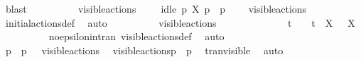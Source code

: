 \begin{isabellebody}
\ blast\isanewline
\ \ \ \ \ \ \isamarkupfalse%
\ {\isacartoucheopen}{\isasymalpha}\ {\isasymin}\ visible{\isacharunderscore}{\kern0pt}actions\ {\isasymor}\ {\isasymalpha}\ {\isacharequal}{\kern0pt}\ {\isasymtau}{\isacartoucheclose}\ {\isacartoucheopen}idle\ p\ X{\isacartoucheclose}\ {\isacartoucheopen}p\ {\isasymlongmapsto}{\isasymalpha}\ p{\isacharprime}{\kern0pt}{\isacartoucheclose}\ \isamarkupfalse%
\ {\isacartoucheopen}{\isasymalpha}\ {\isasymin}\ visible{\isacharunderscore}{\kern0pt}actions{\isacartoucheclose}\ \isanewline
\ \ \ \ \ \ \ \ \isamarkupfalse%
\ initial{\isacharunderscore}{\kern0pt}actions{\isacharunderscore}{\kern0pt}def\ \isamarkupfalse%
\ auto\isanewline
\ \ \ \ \ \ \isamarkupfalse%
\ {\isacartoucheopen}{\isasymalpha}\ {\isasymin}\ visible{\isacharunderscore}{\kern0pt}actions{\isacartoucheclose}\isanewline
\ \ \ \ \ \ \isamarkupfalse%
\ {\isacartoucheopen}{\isasymalpha}\ {\isasymnoteq}\ {\isasymtau}\ {\isasymand}\ {\isasymalpha}\ {\isasymnoteq}\ t\ {\isasymand}\ {\isasymalpha}\ {\isasymnoteq}\ t{\isacharunderscore}{\kern0pt}{\isasymepsilon}\ {\isasymand}\ {\isacharparenleft}{\kern0pt}{\isasymforall}X{\isachardot}{\kern0pt}\ {\isasymalpha}\ {\isasymnoteq}\ {\isasymepsilon}{\isacharbrackleft}{\kern0pt}X{\isacharbrackright}{\kern0pt}{\isacharparenright}{\kern0pt}{\isacartoucheclose}\isanewline
\ \ \ \ \ \ \ \ \isamarkupfalse%
\ no{\isacharunderscore}{\kern0pt}epsilon{\isacharunderscore}{\kern0pt}in{\isacharunderscore}{\kern0pt}tran\ visible{\isacharunderscore}{\kern0pt}actions{\isacharunderscore}{\kern0pt}def\ \isamarkupfalse%
\ auto\isanewline
\isanewline
\ \ \ \ \ \ \isamarkupfalse%
\ {\isacartoucheopen}p\ {\isasymlongmapsto}{\isasymalpha}\ p{\isacharprime}{\kern0pt}{\isacartoucheclose}\ {\isacartoucheopen}{\isasymalpha}\ {\isasymin}\ visible{\isacharunderscore}{\kern0pt}actions{\isacartoucheclose}\ \isamarkupfalse%
\ {\isacartoucheopen}{\isasymtheta}{\isacharbrackleft}{\kern0pt}visible{\isacharunderscore}{\kern0pt}actions{\isacharbrackright}{\kern0pt}{\isacharparenleft}{\kern0pt}p{\isacharparenright}{\kern0pt}\ {\isasymlongmapsto}\isactrlsup {\isasymtheta}{\isasymalpha}\ {\isasymtheta}{\isacharparenleft}{\kern0pt}p{\isacharprime}{\kern0pt}{\isacharparenright}{\kern0pt}{\isacartoucheclose}\ \isamarkupfalse%
\ tran{\isacharunderscore}{\kern0pt}visible\ \isamarkupfalse%
\ auto\isanewline
\ \ \ \ \ \ \isamarkupfalse%
\ \isamarkupfalse%

\end{isabellebody}

